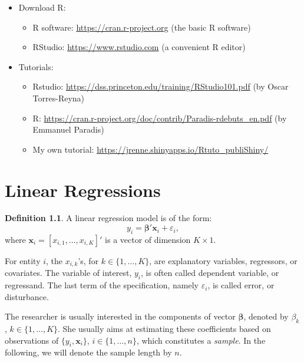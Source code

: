\documentclass[
  12pt,
]{book}
\providecommand{\tightlist}{%
  \setlength{\itemsep}{0pt}\setlength{\parskip}{0pt}}
\theoremstyle{definition}
\newtheorem{definition}{Definition}[chapter]
\theoremstyle{definition}
\theoremstyle{definition}
\theoremstyle{definition}
\theoremstyle{remark}
\begin{document}
\begin{itemize}
\item
  Download R:

  \begin{itemize}
  \tightlist
  \item
    R software: \url{https://cran.r-project.org} (the basic R software)
  \item
    RStudio: \url{https://www.rstudio.com} (a convenient R editor)
  \end{itemize}
\item
  Tutorials:

  \begin{itemize}
  \tightlist
  \item
    Rstudio: \url{https://dss.princeton.edu/training/RStudio101.pdf} (by Oscar Torres-Reyna)
  \item
    R: \url{https://cran.r-project.org/doc/contrib/Paradis-rdebuts_en.pdf} (by Emmanuel Paradis)
  \item
    My own tutorial: \url{https://jrenne.shinyapps.io/Rtuto_publiShiny/}
  \end{itemize}
\end{itemize}

\hypertarget{ChapterLS}{%
\chapter{Linear Regressions}\label{ChapterLS}}

\begin{definition}
\protect\hypertarget{def:essai}{}\label{def:essai}A linear regression model is of the form:
\begin{equation}
y_i = \boldsymbol\beta'\mathbf{x}_{i} + \varepsilon_i,\label{eq:linearspecif}
\end{equation}
where \(\mathbf{x}_{i}=[x_{i,1},\dots,x_{i,K}]'\) is a vector of dimension \(K \times 1\).
\end{definition}

For entity \(i\), the \(x_{i,k}\)'s, for \(k \in \{1,\dots,K\}\), are explanatory variables, regressors, or covariates. The variable of interest, \(y_i\), is often called dependent variable, or regressand. The last term of the specification, namely \(\varepsilon_i\), is called error, or disturbance.

The researcher is usually interested in the components of vector \(\boldsymbol\beta\), denoted by \(\beta_k\), \(k \in \{1,\dots,K\}\). She usually aims at estimating these coefficients based on observations of \(\{y_i,\mathbf{x}_{i}\}\), \(i \in \{1,\dots,n\}\), which constitutes a \emph{sample}. In the following, we will denote the sample length by \(n\).
\end{document}
